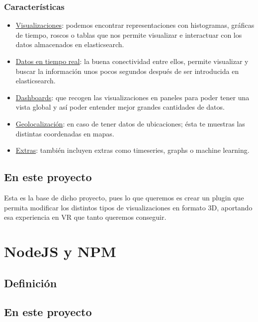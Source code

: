 \documentclass[a4paper, 12pt]{book}
\begin{document}
\subsubsection{Caracter\'isticas}
\begin{itemize}
\item \underline{Visualizaciones}: podemos encontrar representaciones con histogramas, gr\'aficas de tiempo, roscos o tablas que nos permite visualizar e interactuar con los datos almacenados en elasticsearch.
\item \underline{Datos en tiempo real}: la buena conectividad entre ellos, permite visualizar y buscar la informaci\'on unos pocos segundos despu\'es de ser introducida en elasticsearch.
\item \underline{Dashboards}: que recogen las visualizaciones en paneles para poder tener una vista global y as\'i poder entender mejor grandes cantidades de datos.
\item \underline{Geolocalizaci\'on}: en caso de tener datos de ubicaciones; \'esta te muestras las distintas coordenadas en mapas.
\item \underline{Extras}: tambi\'en incluyen extras como timeseries, graphs o machine learning.
\end{itemize}
\subsection{En este proyecto}
Esta es la base de dicho proyecto, pues lo que queremos es crear un plugin que permita modificar los distintos tipos de visualizaciones en formato 3D, aportando esa experiencia en VR que tanto queremos conseguir.



\section{NodeJS y NPM}
\label{sec:nodejs}
\subsection{Definici\'on}
\subsection{En este proyecto}

\end{document}
